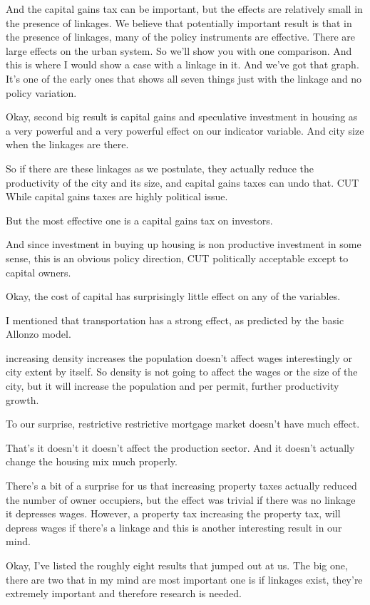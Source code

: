 And the capital gains tax can be important, but the effects are relatively small in the presence of linkages. We believe that potentially important result is that in the presence of linkages, many of the policy instruments are effective.
There are large effects on the urban system. So we'll show you with one comparison. And this is where I would show a case with a linkage in it. And we've got that graph. It's one of the early ones that shows all seven things just with the linkage and no policy variation. 

Okay, second big result is capital gains and speculative investment in housing as a very powerful and a very powerful effect on our indicator variable. And city size when the linkages are there.


So if there are these linkages as we postulate, they actually reduce the productivity of the city and its size, and capital gains taxes can undo that. CUT While capital gains taxes are highly political issue.


But the most effective one is a capital gains tax on investors.


And since investment in buying up housing is non productive investment in some sense, this is an obvious policy direction, CUT politically acceptable except to capital owners.

Okay, the cost of capital has surprisingly little effect on any of the variables. 

I mentioned that transportation has a strong effect, as predicted by the basic Allonzo model. 

increasing density increases the population doesn't affect wages interestingly or city extent by itself. So density is not going to affect the wages or the size of the city, but it will increase the population and per permit, further productivity growth.


To our surprise, restrictive restrictive mortgage market doesn't have much effect.

That's it doesn't it doesn't affect the production sector. And it doesn't actually change the housing mix much properly. 

There's a bit of a surprise for us that increasing property taxes actually reduced the number of owner occupiers, but the effect was trivial if there was no linkage it depresses wages. However, a property tax increasing the property tax, will depress wages if there's a linkage and this is another interesting result in our mind. 

Okay, I've listed the roughly eight results that jumped out at us. The big one, there are two that in my mind are most important one is if linkages exist, they're extremely important and therefore research is needed.

